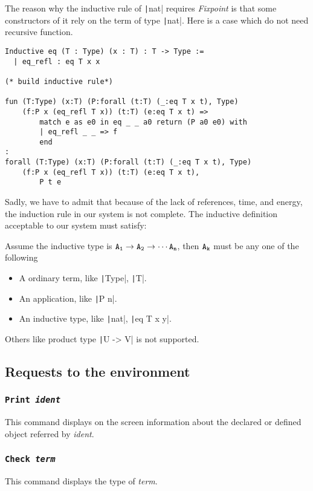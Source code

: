 The reason why the inductive rule of \texttt|nat| requires {\it Fixpoint} is that some constructors of it
rely on the term of type \texttt|nat|. Here is a case which do not need recursive function.
\begin{center}
\begin{verbatim}
Inductive eq (T : Type) (x : T) : T -> Type :=
  | eq_refl : eq T x x

(* build inductive rule*)

fun (T:Type) (x:T) (P:forall (t:T) (_:eq T x t), Type) 
    (f:P x (eq_refl T x)) (t:T) (e:eq T x t) => 
        match e as e0 in eq _ _ a0 return (P a0 e0) with 
        | eq_refl _ _ => f
        end
: 
forall (T:Type) (x:T) (P:forall (t:T) (_:eq T x t), Type) 
    (f:P x (eq_refl T x)) (t:T) (e:eq T x t),
        P t e
\end{verbatim}
\end{center}
Sadly, we have to admit that because of the lack of references, time, and energy,
the induction rule in our system is not complete.
The inductive definition acceptable to our system must satisfy:\par
Assume the inductive type is $\tt A_1\to A_2\to \cdots A_n$, then $\tt A_k$ must be
any one of the following
\begin{itemize}
\item A ordinary term, like \texttt|Type|, \texttt|T|.
\item An application, like \texttt|P n|.
\item An inductive type, like \texttt|nat|, \texttt|eq T x y|.
\end{itemize}
Others like product type \texttt|U -> V| is not supported.

\subsection{Requests to the environment}
\subsubsection{\tt Print \sl ident}
This command displays on the screen information about the declared or defined object referred by {\sl ident}.
\subsubsection{\tt Check \sl term}
This command displays the type of {\sl term}.

